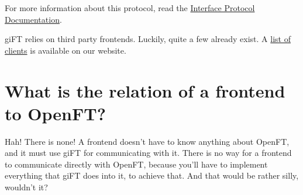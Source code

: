 \documentclass[10pt]{article}
\begin{document}
For more information about this protocol, read the
\href{http://gift.sourceforge.net/docs.php?document=interface.html}{Interface
Protocol Documentation}.

giFT relies on third party frontends. Luckily, quite a few already exist. A
\href{http://gift.sourceforge.net/dev/clients.php}{list of clients} is
available on our website.

\section{What is the relation of a frontend to OpenFT?}
Hah! There is none! A frontend doesn't have to know anything about OpenFT, and
it must use giFT for communicating with it. There is no way for a frontend to
communicate directly with OpenFT, because you'll have to implement everything
that giFT does into it, to achieve that. And that would be rather silly,
wouldn't it?
\end{document}
